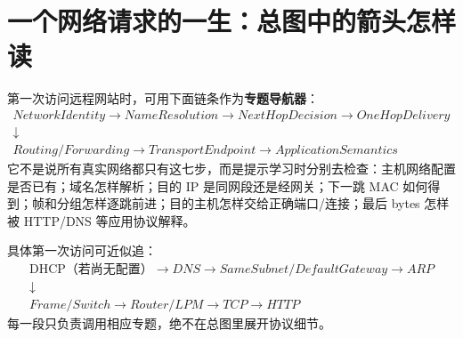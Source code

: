 \documentclass[11pt,a4paper,openany]{ctexbook}
\newcommand{\key}[1]{\textbf{\color{deep}#1}}
\begin{document}
\section{一个网络请求的一生：总图中的箭头怎样读}
第一次访问远程网站时，可用下面链条作为\key{专题导航器}：
\[
\boxed{\begin{gathered}
NetworkIdentity\rightarrow NameResolution\rightarrow NextHopDecision\rightarrow OneHopDelivery\\
\downarrow\\
Routing/Forwarding\rightarrow TransportEndpoint\rightarrow ApplicationSemantics
\end{gathered}}
\]
它不是说所有真实网络都只有这七步，而是提示学习时分别去检查：主机网络配置是否已有；域名怎样解析；目的 IP 是同网段还是经网关；下一跳 MAC 如何得到；帧和分组怎样逐跳前进；目的主机怎样交给正确端口/连接；最后 bytes 怎样被 HTTP/DNS 等应用协议解释。

具体第一次访问可近似追：
\[
\begin{gathered}
\text{DHCP（若尚无配置）}\rightarrow DNS\rightarrow SameSubnet/DefaultGateway\rightarrow ARP\\
\downarrow\\
Frame/Switch\rightarrow Router/LPM\rightarrow TCP\rightarrow HTTP
\end{gathered}
\]
每一段只负责调用相应专题，绝不在总图里展开协议细节。
\end{document}
